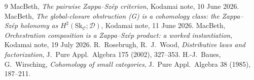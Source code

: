 \documentclass[11pt]{article}
\theoremstyle{definition}
\newcommand{\C}{\mathcal{C}}
\newcommand{\D}{\mathcal{D}}
\newcommand{\Sk}{\mathrm{Sk}}
\begin{document}
\begin{thebibliography}{9}
 MacBeth, \emph{The pairwise Zappa--Sz\'ep criterion}, Kodamai
note, 10 June 2026.
 MacBeth, \emph{The global-closure obstruction (G) is a cohomology
class: the Zappa--Sz\'ep holonomy as $H^2(\Sk_\C;\D)$}, Kodamai note, 11 June 2026.
 MacBeth, \emph{Orchestration composition is a Zappa--Sz\'ep
product: a worked instantiation}, Kodamai note, 19 July 2026.
 R.~Rosebrugh, R.~J.~Wood, \emph{Distributive laws and factorization},
J.\ Pure Appl.\ Algebra 175 (2002), 327--353.
 H.-J.~Baues, G.~Wirsching, \emph{Cohomology of small categories},
J.\ Pure Appl.\ Algebra 38 (1985), 187--211.
\end{thebibliography}
\end{document}
